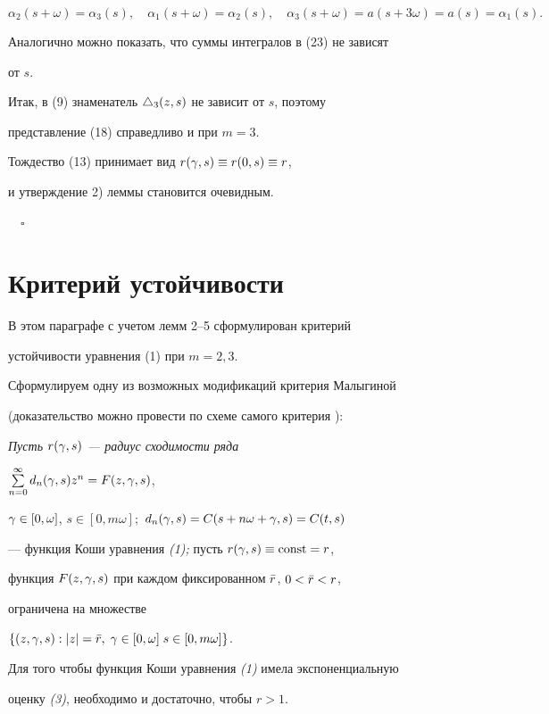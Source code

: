 $$


\alpha_2(s+\omega)=\alpha_3(s),\quad \alpha_1(s+\omega)=\alpha_2(s),


\quad \alpha_3(s+\omega)=a(s+3\omega)=a(s)=\alpha_1(s).


$$


Аналогично можно показать, что суммы интегралов в (23) не зависят


от $s$.





Итак, в (9) знаменатель $\triangle_3(z,s)$ не зависит от $s$, поэтому


представление (18) справедливо и при $m=3$.


Тождество (13) принимает вид $r(\gamma,s)\equiv r(0,s)\equiv r$,


и утверждение 2) леммы становится очевидным.


$\quad\square$





\section{Критерий устойчивости}





В этом параграфе с учетом лемм 2--5 сформулирован критерий


устойчивости уравнения (1) при $m=2,3$.





Сформулируем одну из возможных модификаций критерия Малыгиной


(доказательство можно провести по схеме самого критерия \cite{Ma2}):





{\it Пусть $r(\gamma,s)$ --- радиус сходимости ряда


$\sum\limits_{n=0}^\infty d_n(\gamma,s)z^n=F(z,\gamma,s)$,


$\gamma\in[0,\omega]$, $s\in[0,m\omega];$ $d_n(\gamma,s)=C(s+n\omega+\gamma,s)=C(t,s)$


--- функция Коши уравнения {\em (1);} пусть $r(\gamma,s)\equiv \operatorname{const}=r$,


функция $F(z,\gamma,s)$ при каждом фиксированном $\Bar r$, $0<\Bar r<r$,


ограничена на множестве


$\{(z,\gamma,s):|z|=\Bar r,\; \gamma\in[0,\omega]\;s\in[0,m\omega]\}$.


Для того чтобы функция Коши уравнения {\em (1)} имела экспоненциальную


оценку {\em (3)}, необходимо и достаточно, чтобы $r>1$.}





